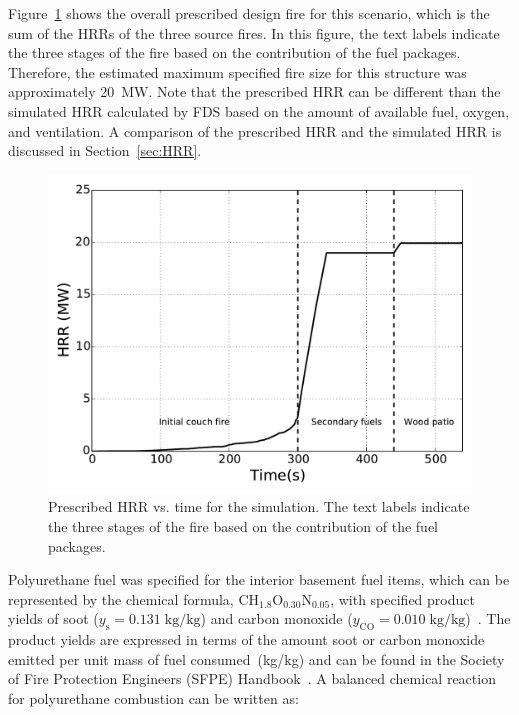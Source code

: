 \documentclass[12pt,oneside]{book}
\renewcommand{\C}{\mbox{C}}
\renewcommand{\H}{\mbox{H}}
\renewcommand{\O}{\mbox{O}}
\newcommand{\N}{\mbox{N}}
\begin{document}
\clearpage


Figure~\ref{fig:hrr} shows the overall prescribed design fire for this scenario, which is the sum of the HRRs of the three source fires. In this figure, the text labels indicate the three stages of the fire based on the contribution of the fuel packages. Therefore, the estimated maximum specified fire size for this structure was approximately 20~MW. Note that the prescribed HRR can be different than the simulated HRR calculated by FDS based on the amount of available fuel, oxygen, and ventilation. A comparison of the prescribed HRR and the simulated HRR is discussed in Section~\ref{sec:HRR}.

\begin{figure}[!ht]
\includegraphics[width=5.5in]{../Figures/Fire_HRR}
\caption[Prescribed HRR vs. time for the simulation.]
{Prescribed HRR vs. time for the simulation. The text labels indicate the three stages of the fire based on the contribution of the fuel packages.}
\label{fig:hrr}
\end{figure}

Polyurethane fuel was specified for the interior basement fuel items, which can be represented by the chemical formula, $\C\H_{1.8}\O_{0.30}\N_{0.05}$, with specified product yields of soot ($y_{\mathrm{s}}=0.131 \; \mathrm{kg}/\mathrm{kg}$) and carbon monoxide ($y_{\mathrm{CO}}=0.010 \; \mathrm{kg}/\mathrm{kg}$)~\cite{SFPE:Tewarson}. The product yields are expressed in terms of the amount soot or carbon monoxide emitted per unit mass of fuel consumed~(kg/kg) and can be found in the Society of Fire Protection Engineers (SFPE) Handbook~\cite{SFPE:Tewarson}. A balanced chemical reaction for polyurethane combustion can be written as:
\end{document}
